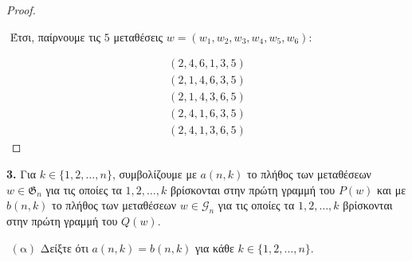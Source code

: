 \documentclass[oneside,a4paper]{article}
\begin{document}
\begin{proof}
\begin{center}
    \end{center}

    $ $\newline
    Έτσι, παίρνουμε τις $5$ μεταθέσεις $w = (w_1, w_2, w_3 ,w_4 ,w_5 , w_6)$:

    \[\begin{matrix} (2,4,6,1,3,5) \\ (2,1,4,6,3,5) \\ (2,1,4,3,6,5) \\ (2,4,1,6,3,5) \\ (2,4,1,3,6,5)\end{matrix}\]
\end{proof}



\pagebreak

\noindent \textbf{3. } Για $k \in \{1,2,\ldots,n\}$, συμβολίζουμε με $a(n,k)$ το πλήθος των μεταθέσεων $w \in \mathfrak{G}_n$ για τις οποίες τα $1,2,\ldots,k$ βρίσκονται στην πρώτη γραμμή του $P(w)$ και με $b(n,k)$ το πλήθος των μεταθέσεων $w \in \mathcal{G}_n$ για τις οποίες τα $1,2,\ldots,k$ βρίσκονται στην πρώτη γραμμή του $Q(w)$.

$ $\newline
$(\text{α} )$ Δείξτε ότι $a(n,k) = b(n,k)$ για κάθε $k \in \{1,2,\ldots,n\}$.
\end{document}
